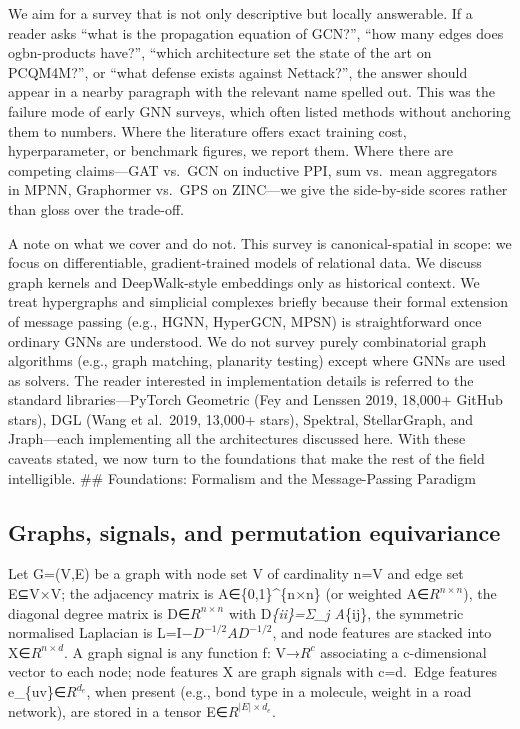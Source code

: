 We aim for a survey that is not only descriptive but locally answerable. If a reader asks ``what is the propagation equation of GCN?'', ``how many edges does ogbn-products have?'', ``which architecture set the state of the art on PCQM4M?'', or ``what defense exists against Nettack?'', the answer should appear in a nearby paragraph with the relevant name spelled out. This was the failure mode of early GNN surveys, which often listed methods without anchoring them to numbers. Where the literature offers exact training cost, hyperparameter, or benchmark figures, we report them. Where there are competing claims---GAT vs.~GCN on inductive PPI, sum vs.~mean aggregators in MPNN, Graphormer vs.~GPS on ZINC---we give the side-by-side scores rather than gloss over the trade-off.

A note on what we cover and do not. This survey is canonical-spatial in scope: we focus on differentiable, gradient-trained models of relational data. We discuss graph kernels and DeepWalk-style embeddings only as historical context. We treat hypergraphs and simplicial complexes briefly because their formal extension of message passing (e.g., HGNN, HyperGCN, MPSN) is straightforward once ordinary GNNs are understood. We do not survey purely combinatorial graph algorithms (e.g., graph matching, planarity testing) except where GNNs are used as solvers. The reader interested in implementation details is referred to the standard libraries---PyTorch Geometric (Fey and Lenssen 2019, 18,000+ GitHub stars), DGL (Wang et al.~2019, 13,000+ stars), Spektral, StellarGraph, and Jraph---each implementing all the architectures discussed here. With these caveats stated, we now turn to the foundations that make the rest of the field intelligible.
\#\# Foundations: Formalism and the Message-Passing Paradigm

\subsection{Graphs, signals, and permutation equivariance}\label{graphs-signals-and-permutation-equivariance}

Let G=(V,E) be a graph with node set V of cardinality n=\textbar V\textbar{} and edge set E⊆V×V; the adjacency matrix is A∈\{0,1\}\^{}\{n×n\} (or weighted A∈\(R^{n×n}\)), the diagonal degree matrix is D∈\(R^{n×n}\) with D\emph{\{ii\}=Σ\_j A}\{ij\}, the symmetric normalised Laplacian is L=I−\(D^{−1/2}\)\(AD^{−1/2}\), and node features are stacked into X∈\(R^{n×d}\). A graph signal is any function f: V→\(R^c\) associating a c-dimensional vector to each node; node features X are graph signals with c=d.~Edge features e\_\{uv\}∈\(R^{d_e}\), when present (e.g., bond type in a molecule, weight in a road network), are stored in a tensor E∈\(R^{|E|×d_e}\).


